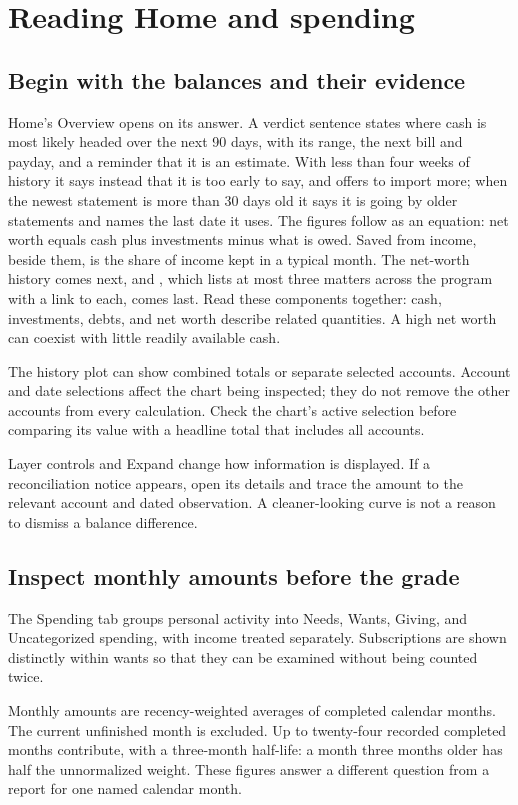 \chapter{Reading Home and spending}\label{ch:spending}
\section{Begin with the balances and their evidence}
Home's Overview opens on its answer. A verdict sentence states where cash is most likely headed over the next 90 days, with its range, the next bill and payday, and a reminder that it is an estimate. With less than four weeks of history it says instead that it is too early to say, and offers to import more; when the newest statement is more than 30 days old it says it is going by older statements and names the last date it uses. The figures follow as an equation: net worth equals cash plus investments minus what is owed. Saved from income, beside them, is the share of income kept in a typical month. The net-worth history comes next, and , which lists at most three matters across the program with a link to each, comes last. Read these components together: cash, investments, debts, and net worth describe related quantities. A high net worth can coexist with little readily available cash.

The history plot can show combined totals or separate selected accounts. Account and date selections affect the chart being inspected; they do not remove the other accounts from every calculation. Check the chart's active selection before comparing its value with a headline total that includes all accounts.

Layer controls and Expand change how information is displayed. If a reconciliation notice appears, open its details and trace the amount to the relevant account and dated observation. A cleaner-looking curve is not a reason to dismiss a balance difference.

\section{Inspect monthly amounts before the grade}
The Spending tab groups personal activity into Needs, Wants, Giving, and Uncategorized spending, with income treated separately. Subscriptions are shown distinctly within wants so that they can be examined without being counted twice.

Monthly amounts are recency-weighted averages of completed calendar months. The current unfinished month is excluded. Up to twenty-four recorded completed months contribute, with a three-month half-life: a month three months older has half the unnormalized weight. These figures answer a different question from a report for one named calendar month.

